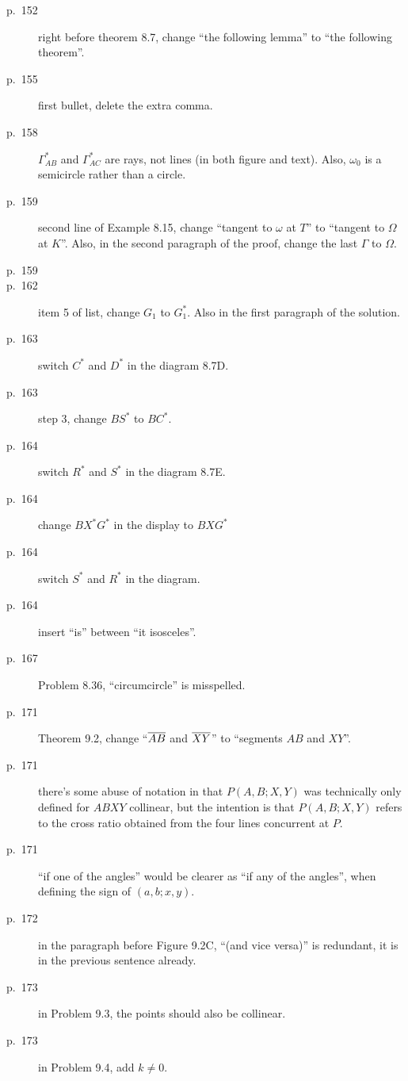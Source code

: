 \documentclass[11pt]{scrartcl}
\begin{document}
\begin{description}
\item[p.\  152] right before theorem 8.7,
  change ``the following lemma'' to ``the following theorem''.
\item[p.\  155] first bullet, delete the extra comma.
\item[p.\  158] $\Gamma_{AB}^\ast$ and $\Gamma_{AC}^\ast$ are rays, not lines (in both figure and text).
  Also, $\omega_0$ is a semicircle rather than a circle.
\item[p.\  159] second line of Example 8.15,
  change ``tangent to $\omega$ at $T$'' to ``tangent to $\Omega$ at $K$''.
  Also, in the second paragraph of the proof, change the last $\Gamma$ to $\Omega$.
\item[p.\  159] 
\item[p.\  162] item 5 of list, change $G_1$ to $G_1^\ast$.
  Also in the first paragraph of the solution.
\item[p.\  163] switch $C^\ast$ and $D^\ast$ in the diagram 8.7D.
\item[p.\  163] step 3, change $BS^\ast$ to $BC^\ast$.
\item[p.\  164] switch $R^\ast$ and $S^\ast$ in the diagram 8.7E.
\item[p.\  164] change $BX^\ast G^\ast$ in the display to $BXG^\ast$
\item[p.\  164] switch $S^\ast$ and $R^\ast$ in the diagram.
\item[p.\  164] insert ``is'' between ``it isosceles''.
\item[p.\  167] Problem 8.36, ``circumcircle'' is misspelled.
\item[p.\  171] Theorem 9.2, change ``$\overline{AB}$ and $\overline{XY}$'' to ``segments $AB$ and $XY$''.
\item[p.\  171] there's some abuse of notation in that $P(A,B;X,Y)$
  was technically only defined for $ABXY$ collinear,
  but the intention is that $P(A,B;X,Y)$ refers to the cross ratio obtained
  from the four lines concurrent at $P$.
\item[p.\  171] ``if one of the angles'' would be clearer as ``if any of the
  angles'', when defining the sign of $(a,b;x,y)$.
\item[p.\  172] in the paragraph before Figure 9.2C,
  ``(and vice versa)'' is redundant, it is in the previous sentence already.
\item[p.\  173] in Problem 9.3, the points should also be collinear.
\item[p.\  173] in Problem 9.4, add $k \neq 0$.

\end{description}
\end{document}
